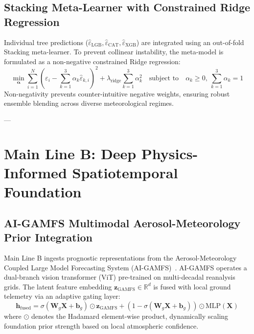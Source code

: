 \subsection{Stacking Meta-Learner with Constrained Ridge Regression}
\label{subsec:stacking_ensemble}

Individual tree predictions ($\hat{\varepsilon}_{\text{LGB}}, \hat{\varepsilon}_{\text{CAT}}, \hat{\varepsilon}_{\text{XGB}}$) are integrated using an out-of-fold Stacking meta-learner. To prevent collinear instability, the meta-model is formulated as a non-negative constrained Ridge regression:
\begin{equation}
\label{eq:ridge_stacking}
\min_{\boldsymbol{\alpha}} \sum_{i=1}^N \left( \varepsilon_i - \sum_{k=1}^3 \alpha_k \hat{\varepsilon}_{k, i} \right)^2 + \lambda_{\text{ridge}} \sum_{k=1}^3 \alpha_k^2 \quad \text{subject to} \quad \alpha_k \ge 0, \ \sum_{k=1}^3 \alpha_k = 1
\end{equation}
Non-negativity prevents counter-intuitive negative weights, ensuring robust ensemble blending across diverse meteorological regimes.

---

\section{Main Line B: Deep Physics-Informed Spatiotemporal Foundation}
\label{sec:main_line_b}

\subsection{AI-GAMFS Multimodal Aerosol-Meteorology Prior Integration}
\label{subsec:aigamfs_prior}

Main Line B ingests prognostic representations from the Aerosol-Meteorology Coupled Large Model Forecasting System (AI-GAMFS)~\cite{ref2}. AI-GAMFS operates a dual-branch vision transformer (ViT) pre-trained on multi-decadal reanalysis grids. The latent feature embedding $\mathbf{z}_{\text{GAMFS}} \in \mathbb{R}^{d}$ is fused with local ground telemetry via an adaptive gating layer:
\begin{equation}
\label{eq:gamfs_gate}
\mathbf{h}_{\text{fused}} = \sigma\left(\mathbf{W}_g \mathbf{X} + \mathbf{b}_g\right) \odot \mathbf{z}_{\text{GAMFS}} + \left(1 - \sigma\left(\mathbf{W}_g \mathbf{X} + \mathbf{b}_g\right)\right) \odot \text{MLP}(\mathbf{X})
\end{equation}
where $\odot$ denotes the Hadamard element-wise product, dynamically scaling foundation prior strength based on local atmospheric confidence.

